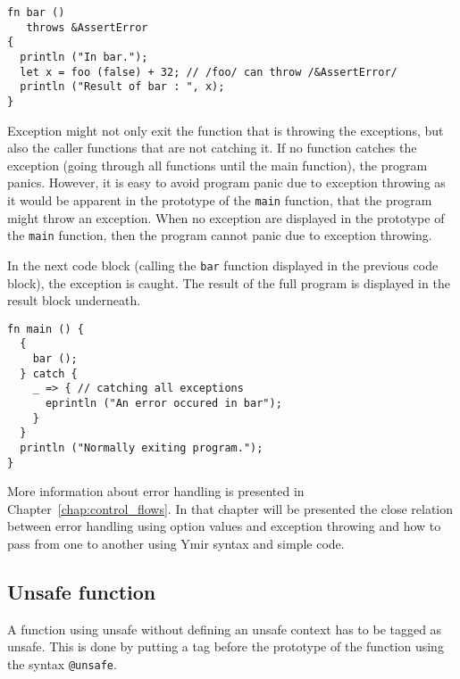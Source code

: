 \begin{lstlisting}[style=coloredverbatim]
fn bar ()
   throws &AssertError
{
  println ("In bar.");
  let x = foo (false) + 32; // /foo/ can throw /&AssertError/
  println ("Result of bar : ", x);
}
\end{lstlisting}

Exception might not only exit the function that is throwing the exceptions, but
also the caller functions that are not catching it. If no function catches the
exception (going through all functions until the main function), the program
panics. However, it is easy to avoid program panic due to exception throwing as
it would be apparent in the prototype of the \texttt{main} function, that the
program might throw an exception. When no exception are displayed in the
prototype of the \texttt{main} function, then the program cannot panic due to
exception throwing.

In the next code block (calling the \texttt{bar} function displayed in the
previous code block), the exception is caught. The result of the full program is
displayed in the result block underneath.




\begin{lstlisting}[style=coloredverbatim]
fn main () {
  {
    bar ();
  } catch {
    _ => { // catching all exceptions
      eprintln ("An error occured in bar");
    }
  }
  println ("Normally exiting program.");
}
\end{lstlisting}


More information about error handling is presented in
Chapter~\ref{chap:control_flows}. In that chapter will be presented the close
relation between error handling using option values and exception throwing and
how to pass from one to another using Ymir syntax and simple code.

\subsection {Unsafe function}

A function using unsafe without defining an unsafe context has to be tagged as
unsafe. This is done by putting a tag before the prototype of the function using
the syntax \texttt{@unsafe}.

